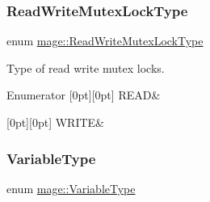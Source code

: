 \subsubsection{\texorpdfstring{Read\+Write\+Mutex\+Lock\+Type}{ReadWriteMutexLockType}}
{\footnotesize\ttfamily enum \hyperlink{namespacemage_afd76fcca37ce5c5b2227671290973c74}{mage\+::\+Read\+Write\+Mutex\+Lock\+Type}}

Type of read write mutex locks. \begin{DoxyEnumFields}{Enumerator}
[0pt][0pt]{}\hypertarget{namespacemage_afd76fcca37ce5c5b2227671290973c74a384918b13691984406aeb754f1c454d0}{}\label{namespacemage_afd76fcca37ce5c5b2227671290973c74a384918b13691984406aeb754f1c454d0} 
R\+E\+AD&\\
\hline

[0pt][0pt]{}\hypertarget{namespacemage_afd76fcca37ce5c5b2227671290973c74aff9d196f4bda4079f3f1ce90bd644662}{}\label{namespacemage_afd76fcca37ce5c5b2227671290973c74aff9d196f4bda4079f3f1ce90bd644662} 
W\+R\+I\+TE&\\
\hline

\end{DoxyEnumFields}
\hypertarget{namespacemage_a530428e73bac0ba7fe84b29086a9e33a}{}\label{namespacemage_a530428e73bac0ba7fe84b29086a9e33a} 
\subsubsection{\texorpdfstring{Variable\+Type}{VariableType}}
{\footnotesize\ttfamily enum \hyperlink{namespacemage_a530428e73bac0ba7fe84b29086a9e33a}{mage\+::\+Variable\+Type}}

